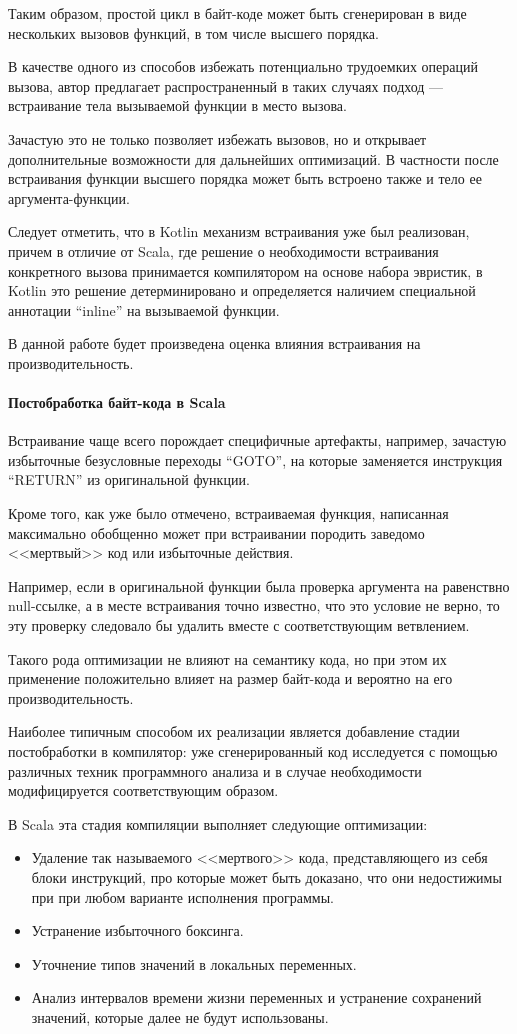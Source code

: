 Таким образом, простой цикл в байт-коде может быть сгенерирован в виде нескольких вызовов функций,
в том числе высшего порядка.

В качестве одного из способов избежать потенциально трудоемких операций вызова, автор предлагает
распространенный в таких случаях подход --- встраивание тела вызываемой функции в место
вызова\cite{Muchnick}.

Зачастую это не только позволяет избежать вызовов, но и открывает дополнительные возможности для
дальнейших оптимизаций.
В частности после встраивания функции высшего порядка может быть встроено также и тело ее
аргумента-функции.

Следует отметить, что в Kotlin механизм встраивания уже был реализован, причем в отличие от Scala,
где решение о необходимости встраивания конкретного вызова принимается компилятором на основе
набора эвристик, в Kotlin это решение детерминировано и определяется наличием специальной
аннотации ``inline'' на вызываемой функции.

В данной работе будет произведена оценка влияния встраивания на производительность.

\paragraph{Постобработка байт-кода в Scala}
Встраивание чаще всего порождает специфичные артефакты, например, зачастую избыточные безусловные
переходы ``GOTO'', на которые заменяется инструкция ``RETURN'' из оригинальной функции.

Кроме того, как уже было отмечено, встраиваемая функция, написанная максимально обобщенно может
при встраивании породить заведомо <<мертвый>> код или избыточные действия.

Например, если в оригинальной функции была проверка аргумента на равенствно null-ссылке, а в месте
встраивания точно известно, что это условие не верно, то эту проверку следовало бы удалить вместе
с соответствующим ветвлением.

Такого рода оптимизации не влияют на семантику кода, но при этом их применение положительно влияет
на размер байт-кода и вероятно на его производительность.

Наиболее типичным способом их реализации является добавление стадии постобработки в компилятор:
уже сгенерированный код исследуется с помощью различных техник программного анализа и в случае
необходимости модифицируется соответствующим образом.

В Scala эта стадия компиляции выполняет следующие оптимизации:
\begin{itemize}
    \item Удаление так называемого <<мертвого>> кода, представляющего из себя блоки инструкций,
    про которые может быть доказано, что они недостижимы при при любом варианте исполнения
    программы.
    \item Устранение избыточного боксинга.
    \item Уточнение типов значений в локальных переменных.
    \item Анализ интервалов времени жизни переменных и устранение сохранений значений,
    которые далее не будут использованы.
\end{itemize}

